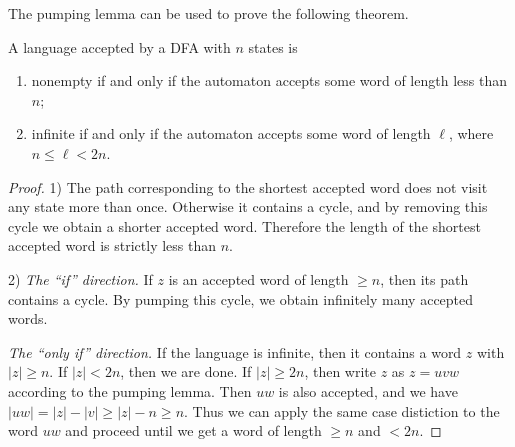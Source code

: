 \begin{page}
\setcounter{section}{3}
\setcounter{subsection}{2}
\setcounter{dfn}{6}
\label{portion:1131}



The pumping lemma can be used to prove the following theorem.


\end{page}

\begin{page}
\setcounter{section}{3}
\setcounter{subsection}{2}
\setcounter{dfn}{7}
\label{portion:1133}

\begin{thm}
A language accepted by a DFA with $n$ states is
\begin{enumerate}
\item
nonempty if and only if the automaton accepts some word of length less than $n$;
\item
infinite if and only if the automaton accepts some word of length $\ell$, where $n \le \ell < 2n$.
\end{enumerate}
\end{thm}

\end{page}

\begin{page}
\setcounter{section}{3}
\setcounter{subsection}{3}
\setcounter{dfn}{7}
\label{portion:1134}

\begin{proof}
1) The path corresponding to the shortest accepted word does not visit any state more than once.
Otherwise it contains a cycle, and by removing this cycle we obtain a shorter accepted word.
Therefore the length of the shortest accepted word is strictly less than $n$.

2) \emph{The ``if'' direction.} If $z$ is an accepted word of length $\ge n$, then its path contains a cycle.
By pumping this cycle, we obtain infinitely many accepted words.

\emph{The ``only if'' direction.} If the language is infinite, then it contains a word $z$ with $|z| \ge n$.
If $|z| < 2n$, then we are done.
If $|z| \ge 2n$, then write $z$ as $z = uvw$ according to the pumping lemma.
Then $uw$ is also accepted, and we have $|uw| = |z| - |v| \ge |z| - n \ge n$.
Thus we can apply the same case distiction to the word $uw$ and proceed until we get a word of length $\ge n$ and $< 2n$.
\end{proof}




\end{page}


